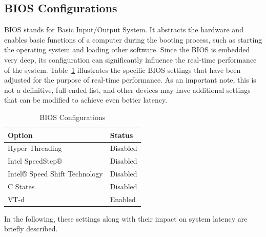 \documentclass[MMR,Master,english]{twbook}
\begin{document}
\clearpage

\subsection{BIOS Configurations}\label{subsec:bios_configurations}

BIOS stands for Basic Input/Output System. It abstracts the hardware and enables basic functions of a computer during the booting process, such as starting the operating system and loading other software. Since the BIOS is embedded very deep, its configuration can significantly influence the real-time performance of the system. Table~\ref{tab:bios_configuration} illustrates the specific BIOS settings that have been adjusted for the purpose of real-time performance. As an important note, this is not a definitive, full-ended list, and other devices may have additional settings that can be modified to achieve even better latency.

\begin{table}[H]
	\centering
	\caption{BIOS Configurations}
	\label{tab:bios_configuration}
	\setlength{\tabcolsep}{0.5em} %
	{\renewcommand{\arraystretch}{1.2}%
		\begin{tabular}{|l|l|}
			\hline
			\textbf{Option}               & \textbf{Status} \\
			\hline
			Hyper Threading               & Disabled        \\
			\hline
			Intel SpeedStep®              & Disabled        \\
			\hline
			Intel® Speed Shift Technology & Disabled        \\
			\hline
			C States                      & Disabled        \\
			\hline
			VT-d                          & Enabled         \\
			\hline
		\end{tabular}}
\end{table}

\noindent In the following, these settings along with their impact on system latency are briefly described.
\end{document}
